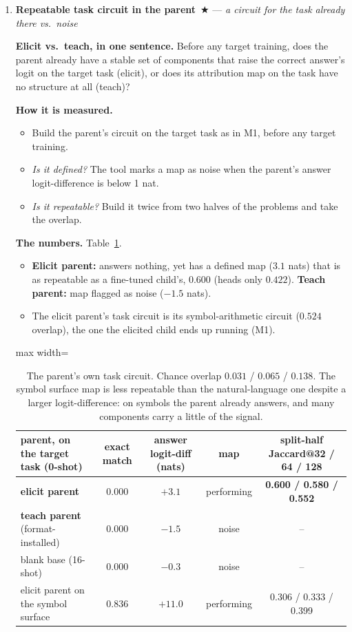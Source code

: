 \documentclass[11pt]{article}
\newcommand{\what}[1]{\par\noindent\textbf{Elicit vs.\ teach, in one sentence.} #1}
\newcommand{\how}[1]{\par\noindent\textbf{How it is measured.} #1}
\newcommand{\numbers}[1]{\par\noindent\textbf{The numbers.} #1\par\medskip}
\newenvironment{steps}{\begin{itemize}[nosep,leftmargin=1.2em,topsep=2pt]}{\end{itemize}}
\newcommand{\metricsecp}[2]{\item \textbf{#1}~$\bigstar$ --- \emph{#2}}
\begin{document}
\begin{enumerate}[label=\textbf{M\arabic*}, leftmargin=*, itemsep=1.2em, resume]
\metricsecp{Repeatable task circuit in the parent}{a circuit for the task already there vs.\ noise}
\what{Before any target training, does the parent already have a stable set of components that
raise the correct answer's logit on the target task (elicit), or does its attribution map on the
task have no structure at all (teach)?}
\how{
\begin{steps}
\item Build the parent's circuit on the target task as in M1, before any target training.
\item \emph{Is it defined?} The tool marks a map as noise when the parent's answer
logit-difference is below 1 nat.
\item \emph{Is it repeatable?} Build it twice from two halves of the problems and take the
overlap.
\end{steps}}
\numbers{Table~\ref{tab:parentcirc}.
\begin{steps}
\item \textbf{Elicit parent:} answers nothing, yet has a defined map ($3.1$ nats) that is as
repeatable as a fine-tuned child's, $0.600$ (heads only $0.422$). \textbf{Teach parent:} map
flagged as noise ($-1.5$ nats).
\item The elicit parent's task circuit is its symbol-arithmetic circuit ($0.524$ overlap), the
one the elicited child ends up running (M1).
\end{steps}}
\begin{table}[h]\centering\small
\begin{adjustbox}{max width=\textwidth}
\begin{tabular}{lcccc}
\toprule
parent, on the target task (0-shot) & exact match & answer logit-diff (nats) & map & split-half Jaccard@32 / 64 / 128 \\
\midrule
\textbf{elicit parent} & 0.000 & $+3.1$ & performing & \textbf{0.600 / 0.580 / 0.552} \\
\textbf{teach parent} (format-installed) & 0.000 & $-1.5$ & noise & -- \\
\midrule
blank base (16-shot) & 0.000 & $-0.3$ & noise & -- \\
elicit parent on the symbol surface & 0.836 & $+11.0$ & performing & 0.306 / 0.333 / 0.399 \\
\bottomrule
\end{tabular}
\end{adjustbox}
\caption{The parent's own task circuit. Chance overlap $0.031$ / $0.065$ / $0.138$. The symbol
surface map is less repeatable than the natural-language one despite a larger logit-difference:
on symbols the parent already answers, and many components carry a little of the signal.}
\label{tab:parentcirc}
\end{table}


\end{enumerate}
\end{document}
